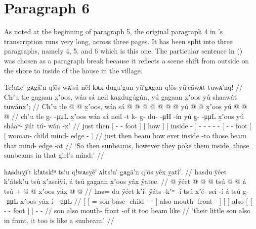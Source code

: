 \section{Paragraph 6}\label{sec:89-para-6}

As noted at the beginning of paragraph 5, the original paragraph 4 in \citeauthor{swanton:1909}’s transcription runs very long, across three pages.
It has been split into three paragraphs, namely 4, 5, and 6 which is this one.
The particular sentence in (\nextx) was chosen as a paragraph break because it reflects a scene shift from outside on the shore to inside of the house in the village.

\ex\label{ex:89-88-sunbeams-poke-inside}%
%
\begingl
	\glpreamble	Tc!uʟe′ g̣ᴀgā′n q!ōs wᴀ′sâ nēł kᴀx dugu′g̣un yū′g̣ᴀgan q!ōs yū′cāwᴀt tuwᴀ′nq!  //
	\glpreamble	Chʼu tle g̱agaan x̱ʼoos, wáa sá neil kax̱dugúg̱ún, yú g̱agaan x̱ʼoos yú shaawát tuwánxʼ; //
	\gla	Chʼu tle {}  @ {} @ {} x̱ʼoos, {}
		{} wáa sá {}
		{}  @ {} {}
		 @ {} @ {} @ {} @ {} @ {} @ {}
		{} yú  @ {} @ {} x̱ʼoos {}
		{} yú  @ {}  @ {} @ {} {} //
	\glb	chʼu tle {} g̱-  -μμL x̱ʼoos {}
		{} wáa sá {}
		{} neil -t {}
		k- {} g̱- du-  -μH -ín
		{} yú g̱-  -μμL x̱ʼoos {}
		{} yú sháaʷ- ÿát tú- wán -xʼ {} //
	\glc	just then {}[ -  - foot {}]
		{}[ how  {}]
		{}[ inside - {}]
		- \· - -  - -
		{}[  -  - foot {}]
		{}[  woman- child mind- edge - {}] //
	\gld	just then {}  {} {} beam {}
		{} how ever {}
		{} inside -to {}  {} {} {} {} {} {}
		{} those  {} {} beam {}
		{} that  {} mind- edge -at {} //
	\glft	‘So then sunbeams, however they poke them inside, those sunbeams in that girl’s mind;’
		//
\endgl
\xe

\ex\label{ex:89-89-son-sunbeam}%
%
\begingl
	\glpreamble	hᴀsduỵī′t k!ᴀtsk!ᵘ ts!u q!wᴀsỵê′ ᴀłts!u′ g̣ᴀgā′n q!ōs yêx ỵatî′. //
	\glpreamble	hasdu ÿéet kʼátskʼu tsú x̱ʼaseiÿí, á tsú g̱agaan x̱ʼoos yáx̱ ÿatee. //
	\gla	{} {}  @ {} ÿéet  @ {} @ {} @ {} {}
			tsú  @ {} @ {} {}
		{} á {} tsú +
		{} {}  @ {} @ {} x̱ʼoos {} yáx̱ {}
		 @ {} @ {} //
	\glb	{} {} has= du ÿéet kʼí- ÿáts -kʼʷ -í {}
			tsú x̱ʼé- sei -í {}
		{} á {} tsú
		{} {} g̱-  -μμL x̱ʼoos {} yáx̱ {}
		i-  -μμL //
	\glc	{}[ {}[ =  son base- child - - {}]
			also mouth- front - {}]
		{}[  {}] also
		{}[ {}[ -  - foot {}]  {}]
		-  - //
	\gld	{} {}  {} son  {} {} {} {}
			also mouth- front -of {}
		{} it {} too
		{} {}  {} {} beam {} like {}
		 {} {}  //
	\glft	‘their little son also in front, it too is like a sunbeam.’
		//
\endgl
\xe

